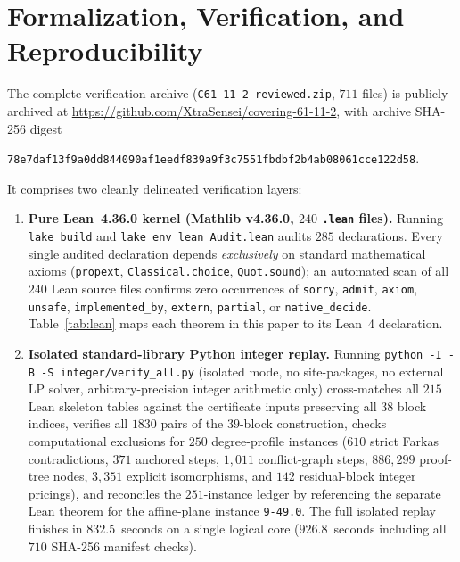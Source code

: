 \documentclass[11pt,a4paper]{article}
\theoremstyle{definition}
\theoremstyle{remark}
\begin{document}
\section{Formalization, Verification, and Reproducibility}\label{sec:verification}

The complete verification archive (\texttt{C61-11-2-reviewed.zip}, $711$ files) is publicly archived at \url{https://github.com/XtraSensei/covering-61-11-2}, with archive SHA-256 digest
\begin{center}
  \small\texttt{78e7daf13f9a0dd844090af1eedf839a9f3c7551fbdbf2b4ab08061cce122d58}.
\end{center}
It comprises two cleanly delineated verification layers:

\begin{enumerate}
  \item \textbf{Pure Lean~4.36.0 kernel (Mathlib v4.36.0, $240$ \texttt{.lean} files).} Running \texttt{lake build} and \texttt{lake env lean Audit.lean} audits $285$ declarations. Every single audited declaration depends \emph{exclusively} on standard mathematical axioms (\texttt{propext}, \texttt{Classical.choice}, \texttt{Quot.sound}); an automated scan of all $240$ Lean source files confirms zero occurrences of \texttt{sorry}, \texttt{admit}, \texttt{axiom}, \texttt{unsafe}, \texttt{implemented\_by}, \texttt{extern}, \texttt{partial}, or \texttt{native\_decide}. Table~\ref{tab:lean} maps each theorem in this paper to its Lean~4 declaration.
  \item \textbf{Isolated standard-library Python integer replay.} Running \texttt{python -I -B -S integer/verify\_all.py} (isolated mode, no site-packages, no external LP solver, arbitrary-precision integer arithmetic only) cross-matches all $215$ Lean skeleton tables against the certificate inputs preserving all $38$ block indices, verifies all $1830$ pairs of the $39$-block construction, checks computational exclusions for $250$ degree-profile instances ($610$ strict Farkas contradictions, $371$ anchored steps, $1{,}011$ conflict-graph steps, $886{,}299$ proof-tree nodes, $3{,}351$ explicit isomorphisms, and $142$ residual-block integer pricings), and reconciles the $251$-instance ledger by referencing the separate Lean theorem for the affine-plane instance \texttt{9-49.0}. The full isolated replay finishes in $832.5$~seconds on a single logical core ($926.8$~seconds including all $710$ SHA-256 manifest checks).
\end{enumerate}
\end{document}
